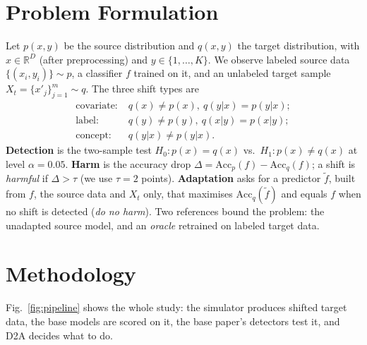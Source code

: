 \documentclass[conference]{IEEEtran}
\newcommand{\Dtwo}{\textsc{D2A}}
\begin{document}
\section{Problem Formulation}
Let $p(x,y)$ be the source distribution and $q(x,y)$ the target distribution, with $x\in\mathbb{R}^D$ (after preprocessing) and $y\in\{1,\dots,K\}$. We observe labeled source data $\{(x_i,y_i)\}\sim p$, a classifier $f$ trained on it, and an unlabeled target sample $X_t=\{x'_j\}_{j=1}^{m}\sim q$. The three shift types are
\begin{align*}
\text{covariate:}\;& q(x)\neq p(x),\ q(y|x)=p(y|x);\\
\text{label:}\;& q(y)\neq p(y),\ q(x|y)=p(x|y);\\
\text{concept:}\;& q(y|x)\neq p(y|x).
\end{align*}
\textbf{Detection} is the two-sample test $H_0: p(x)=q(x)$ vs.\ $H_1: p(x)\neq q(x)$ at level $\alpha=0.05$. \textbf{Harm} is the accuracy drop $\Delta=\mathrm{Acc}_p(f)-\mathrm{Acc}_q(f)$; a shift is \emph{harmful} if $\Delta>\tau$ (we use $\tau=2$ points). \textbf{Adaptation} asks for a predictor $\tilde f$, built from $f$, the source data and $X_t$ only, that maximises $\mathrm{Acc}_q(\tilde f)$ and equals $f$ when no shift is detected (\emph{do no harm}). Two references bound the problem: the unadapted source model, and an \emph{oracle} retrained on labeled target data.

\section{Methodology}
Fig.~\ref{fig:pipeline} shows the whole study: the simulator produces shifted target data, the base models are scored on it, the base paper's detectors test it, and \Dtwo{} decides what to do.
\end{document}
